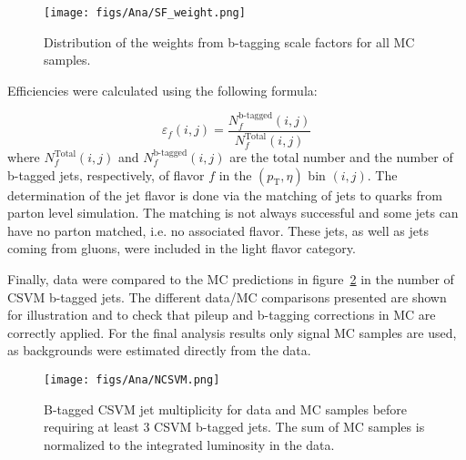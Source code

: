 
\begin{figure}[!Hhtbp]
  \begin{center}
    \texttt{[image: figs/Ana/SF\_weight.png]}
    \caption{Distribution of the weights from b-tagging scale factors for all MC samples.}
    \label{fig:SFweight}
  \end{center}
\end{figure}

Efficiencies were calculated using the following formula:

\begin{equation}
  \label{eq:btaggingeff}
  \varepsilon_f(i,j) = \frac{N_f^\text{b-tagged}(i,j)}{N_f^\text{Total}(i,j)}
\end{equation} where $ N_f^\text{Total}(i,j) $ and $ N_f^\text{b-tagged}(i,j) $ are the total number and the number of b-tagged jets, respectively, of flavor $ f $ in the $ (p_\text{T},\eta) $ bin $ (i,j) $. The determination of the jet flavor is done via the matching of jets to quarks from parton level simulation. The matching is not always successful and some jets can have no parton matched, i.e. no associated flavor. These jets, as well as jets coming from gluons, were included in the light flavor category.

Finally, data were compared to the MC predictions in figure~\ref{fig:Nb} in the number of CSVM b-tagged jets. The different data/MC comparisons presented are shown for illustration and to check that pileup and b-tagging corrections in MC are correctly applied. For the final analysis results only signal MC samples are used, as backgrounds were estimated directly from the data.

\begin{figure}[!Hhtbp]
  \begin{center}
    \texttt{[image: figs/Ana/NCSVM.png]}
    \caption{B-tagged CSVM jet multiplicity for data and MC samples before requiring at least 3 CSVM b-tagged jets. The sum of MC samples is normalized to the integrated luminosity in the data.}
    \label{fig:Nb}
  \end{center}
\end{figure}

